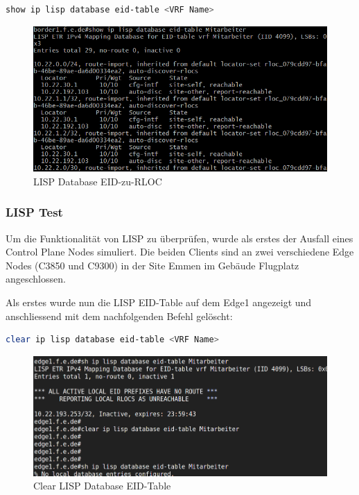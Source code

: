 \begin{lstlisting}[language=bash]
show ip lisp database eid-table <VRF Name>
\end{lstlisting}

\begin{figure}[H]
	\centering
	\includegraphics[width=0.8\linewidth]{img/Absicherung/lisp_eid-table-database-rloc}
	\caption{LISP Database EID-zu-RLOC}
	\label{fig:LISP Database EID-zu-RLOC}
\end{figure}


\subsubsection{LISP Test}
Um die Funktionalität von LISP zu überprüfen, wurde als erstes der Ausfall eines Control Plane Nodes simuliert. Die beiden Clients sind an zwei verschiedene Edge Nodes (C3850 und C9300) in der Site Emmen im Gebäude Flugplatz angeschlossen. 

Als erstes wurde nun die LISP EID-Table auf dem Edge1 angezeigt und anschliessend mit dem nachfolgenden Befehl gelöscht:

\begin{lstlisting}[language=bash]
clear ip lisp database eid-table <VRF Name>
\end{lstlisting} 

\begin{figure}[H]
	\centering
	\includegraphics[width=0.8\linewidth]{img/Absicherung/lisp-eidtabledelete.png}
	\caption{Clear LISP Database EID-Table}
	\label{fig:Clear LISP Database EID-Table}
\end{figure}

